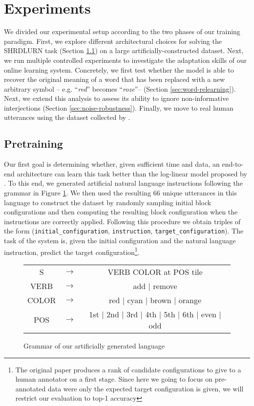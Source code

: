 \section{Experiments}

We divided our experimental setup according to the two phases of our training 
paradigm. First, we explore different architectural choices for solving the 
SHRDLURN task (Section \ref{sec:pretraining}) on a large 
artificially-constructed dataset. Next, we run multiple controlled experiments 
to investigate the adaptation skills of our online learning system. Concretely, 
we first test whether the model is able to recover the original meaning of a 
word 
that has been replaced with a new arbitrary symbol -- e.g. ``\emph{red}'' 
becomes ``\emph{roze}''-- (Section \ref{sec:word-relearning}). Next, we extend 
this analysis to assess its ability to ignore non-informative interjections 
(Section \ref{sec:noise-robustness}). Finally, we move to real human utterances 
using the dataset collected by \cite{Wang:etal:2016}.
 
\subsection{Pretraining}
\label{sec:pretraining}

Our first goal is determining whether, given sufficient time and data, an 
end-to-end architecture can learn this task better than the log-linear model 
proposed by . To this end, we generated artificial 
natural language instructions following the grammar 
in Figure \ref{fig:grammar}. We then used the resulting 66 unique utterances in 
this language to construct the dataset by randomly sampling initial block 
configurations and then computing the resulting block configuration when the 
instructions are correctly applied. Following this procedure we obtain triples 
of the form ({\small \texttt{initial\_configuration}, \texttt{instruction}, 
\texttt{target\_configuration}}). The task of the system is, given the initial 
configuration and the natural language instruction, predict the target 
configuration\footnote{The original paper produces a rank of candidate 
configurations to give to a human annotator on a first stage. Since here we 
going to focus on pre-annotated data were only the expected target 
configuration is given, we will restrict our evaluation to top-1 accuracy}.

\begin{figure}
	\small
	\begin{tabular}{ccc}
		S & $\rightarrow$ & VERB COLOR at POS tile \\
		VERB & $\rightarrow$ & add $\vert$ remove \\
		COLOR & $\rightarrow$ & red $\vert$ cyan $\vert$ brown $\vert$ orange \\
		POS & $\rightarrow$ & 1st $\vert$ 2nd $\vert$ 3rd $\vert$ 4th $\vert$ 
		5th $\vert$ 6th $\vert$ even $\vert$ odd\\
	\end{tabular}
	\caption{Grammar of our artificially generated language\label{fig:grammar}}
\end{figure}

